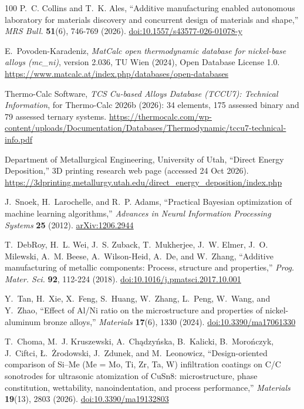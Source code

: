 \documentclass[12pt,letterpaper]{article}
\begin{document}
\begin{thebibliography}{100}
P.~C. Collins and T.~K. Ales, ``Additive manufacturing enabled autonomous laboratory for materials discovery and concurrent design of materials and shape,'' \emph{MRS Bull.} \textbf{51}(6), 746-769 (2026).
\href{https://doi.org/10.1557/s43577-026-01078-y}{doi:10.1557/s43577-026-01078-y}

E.~Povoden-Karadeniz, \emph{MatCalc open thermodynamic database for nickel-base alloys (mc\_ni)}, version 2.036, TU Wien (2024), Open Database License 1.0.
\url{https://www.matcalc.at/index.php/databases/open-databases}

Thermo-Calc Software, \emph{TCS Cu-based Alloys Database (TCCU7):
Technical Information}, for Thermo-Calc 2026b (2026): 34 elements, 175
assessed binary and 79 assessed ternary systems.
\url{https://thermocalc.com/wp-content/uploads/Documentation/Databases/Thermodynamic/tccu7-technical-info.pdf}

Department of Metallurgical Engineering, University of Utah, ``Direct Energy Deposition,'' 3D printing research web page (accessed 24 Oct 2026).
\url{https://3dprinting.metallurgy.utah.edu/direct_energy_deposition/index.php}

J.~Snoek, H.~Larochelle, and R.~P. Adams, ``Practical Bayesian optimization of
machine learning algorithms,'' \emph{Advances in Neural Information Processing
Systems} \textbf{25} (2012).
\href{https://arxiv.org/abs/1206.2944}{arXiv:1206.2944}

T.~DebRoy, H.~L. Wei, J.~S. Zuback, T.~Mukherjee, J.~W. Elmer,
J.~O. Milewski, A.~M. Beese, A.~Wilson-Heid, A.~De, and W.~Zhang, ``Additive
manufacturing of metallic components: Process, structure and properties,''
\emph{Prog. Mater. Sci.} \textbf{92}, 112-224 (2018).
\href{https://doi.org/10.1016/j.pmatsci.2017.10.001}{doi:10.1016/j.pmatsci.2017.10.001}

Y.~Tan, H.~Xie, X.~Feng, S.~Huang, W.~Zhang, L.~Peng, W.~Wang, and Y.~Zhao, ``Effect of Al/Ni ratio on the microstructure and properties of nickel-aluminum bronze alloys,'' \emph{Materials} \textbf{17}(6), 1330 (2024).
\href{https://doi.org/10.3390/ma17061330}{doi:10.3390/ma17061330}

T.~Choma, M.~J. Kruszewski, A.~Chądzyńska, B.~Kalicki, B.~Morończyk, J.~Ciftci, {\L}.~\.{Z}rodowski, J.~Zdunek, and M.~Leonowicz, ``Design-oriented comparison of Si--Me (Me = Mo, Ti, Zr, Ta, W) infiltration coatings on C/C sonotrodes for ultrasonic atomization of CuSn8: microstructure, phase constitution, wettability, nanoindentation, and process performance,'' \emph{Materials} \textbf{19}(13), 2803 (2026).
\href{https://doi.org/10.3390/ma19132803}{doi:10.3390/ma19132803}


\end{thebibliography}
\end{document}

